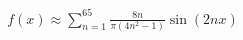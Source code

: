 \documentclass[preview]{standalone}
\begin{document}
\begin{align*}
f(x) \approx \sum_{n=1}^{65} \frac{8n}{\pi(4n^2-1)} \sin(2nx)
\end{align*}
\end{document}
